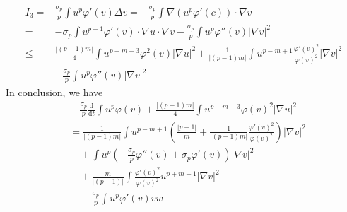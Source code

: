 \documentclass[12pt,]{article}
\begin{document}
\begin{equation}
  \begin{aligned}
    I_3=&\frac{\sigma_{p}}{p}\int u^p\varphi'(v)\Delta v = -\frac{\sigma_{p}}{p}\int \nabla(u^p\varphi'(c))\cdot\nabla v\\
    =&-\sigma_{p}\int u^{p-1}\varphi'(v)\cdot \nabla u\cdot\nabla v -\frac{\sigma_{p}}{p} \int u^p\varphi''(v)|\nabla v|^2\\
    \leqslant & \frac{|(p-1)m|}{4}\int u^{p+m-3}\varphi^2(v)|\nabla u |^{2}+\frac{1}{|(p-1)m|}\int u^{p-m+1}\frac{\varphi'(v)^2}{\varphi(v)^2}|\nabla v|^2\\
    &-\frac{\sigma_{p}}{p} \int u^p\varphi''(v)|\nabla v|^2
  \end{aligned}
\end{equation}
In conclusion, we have
\begin{equation}
  \begin{aligned}
    &\quad\frac{\sigma_{p}}{p}\frac{\mathrm{d}}{\mathrm{d} t} \int u^{p} \varphi(v) +  \frac{|(p-1)m|}{4}\int u^{p+m-3}\varphi(v)^2|\nabla u| ^2 \\
    &= \frac{1}{|(p-1)m|}\int u^{p-m+1}\left(\frac{|p-1|}{m}+\frac{1}{|(p-1)m|}\frac{\varphi'(v)^2}{\varphi(v)^2}\right)|\nabla v|^2\\
    &\quad + \int u^p\left(-\frac{\sigma_{p}}{p}\varphi''(v)+\sigma_{p}\varphi'(v)\right)|\nabla v|^2\\
    &\quad +\frac{m}{|(p-1)|}\int \frac{\varphi'(v)^2}{\varphi(v)^2}u^{p+m-1}|\nabla v|^2\\
    &\quad - \frac{\sigma_{p}}{p}\int u^p\varphi'(v)vw
  \end{aligned}
\end{equation}
\end{document}

